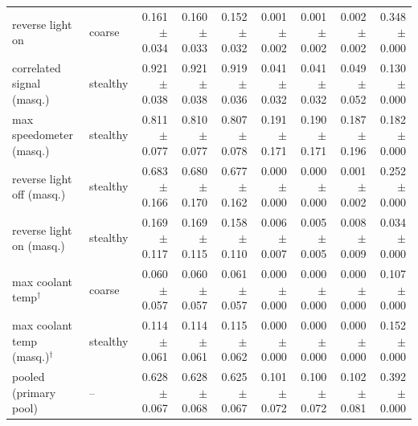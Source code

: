 \begin{table}[t]
\begin{tabular}{@{}llrrrrrrr@{}}
reverse light on & coarse & 0.161 $\pm$ 0.034 & 0.160 $\pm$ 0.033 & 0.152 $\pm$ 0.032 & 0.001 $\pm$ 0.002 & 0.001 $\pm$ 0.002 & 0.002 $\pm$ 0.002 & 0.348 $\pm$ 0.000 \\
correlated signal (masq.) & stealthy & 0.921 $\pm$ 0.038 & 0.921 $\pm$ 0.038 & 0.919 $\pm$ 0.036 & 0.041 $\pm$ 0.032 & 0.041 $\pm$ 0.032 & 0.049 $\pm$ 0.052 & 0.130 $\pm$ 0.000 \\
max speedometer (masq.) & stealthy & 0.811 $\pm$ 0.077 & 0.810 $\pm$ 0.077 & 0.807 $\pm$ 0.078 & 0.191 $\pm$ 0.171 & 0.190 $\pm$ 0.171 & 0.187 $\pm$ 0.196 & 0.182 $\pm$ 0.000 \\
reverse light off (masq.) & stealthy & 0.683 $\pm$ 0.166 & 0.680 $\pm$ 0.170 & 0.677 $\pm$ 0.162 & 0.000 $\pm$ 0.000 & 0.000 $\pm$ 0.000 & 0.001 $\pm$ 0.002 & 0.252 $\pm$ 0.000 \\
reverse light on (masq.) & stealthy & 0.169 $\pm$ 0.117 & 0.169 $\pm$ 0.115 & 0.158 $\pm$ 0.110 & 0.006 $\pm$ 0.007 & 0.005 $\pm$ 0.005 & 0.008 $\pm$ 0.009 & 0.034 $\pm$ 0.000 \\
max coolant temp$^\dagger$ & coarse & 0.060 $\pm$ 0.057 & 0.060 $\pm$ 0.057 & 0.061 $\pm$ 0.057 & 0.000 $\pm$ 0.000 & 0.000 $\pm$ 0.000 & 0.000 $\pm$ 0.000 & 0.107 $\pm$ 0.000 \\
max coolant temp (masq.)$^\dagger$ & stealthy & 0.114 $\pm$ 0.061 & 0.114 $\pm$ 0.061 & 0.115 $\pm$ 0.062 & 0.000 $\pm$ 0.000 & 0.000 $\pm$ 0.000 & 0.000 $\pm$ 0.000 & 0.152 $\pm$ 0.000 \\
pooled (primary pool) & -- & 0.628 $\pm$ 0.067 & 0.628 $\pm$ 0.068 & 0.625 $\pm$ 0.067 & 0.101 $\pm$ 0.072 & 0.100 $\pm$ 0.072 & 0.102 $\pm$ 0.081 & 0.392 $\pm$ 0.000 \\
\bottomrule
\end{tabular}
\end{table}
